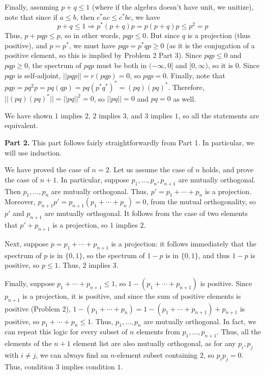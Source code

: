 \documentclass[aps,pra,showpacs,notitlepage,onecolumn,superscriptaddress,nofootinbib]{revtex4-1}
\theoremstyle{definition}
\begin{document}
Finally, assuming $p + q \leq 1$ (where if the algebra doesn't have unit, we unitize), note that since if $a \leq b$, then $c^{*} a c \leq c^{*} b c$, we have
\begin{equation}
  p + q \leq 1 \Longrightarrow p^{*}(p + q)p = p(p + q)p \leq p^2 = p
\end{equation}
Thus, $p + pqp \leq p$, so in other words, $pqp \leq 0$. But since $q$ is a projection (thus positive), and $p = p^{*}$, we must have $pqp = p^{*} q p \geq 0$ (as it is the conjugation of a positive element, so this is implied by Problem 2 Part 3). Since $pqp \leq 0$ and $pqp \geq 0$,
the spectrum of $pqp$ must be both in $(-\infty, 0]$ and $[0, \infty)$, so it is $0$. Since $pqp$ is self-adjoint,
    $||pqp|| = r(pqp) = 0$, so $pqp = 0$. Finally, note that $pqp = pq^2p = pq(qp) = pq(p^{*}q^{*})^{*} = (pq)(pq)^{*}$. Therefore, $||(pq) (pq)^{*}|| = ||pq||^2 = 0$, so $||pq|| = 0$ and $pq = 0$ as well.

    We have shown $1$ implies $2$, $2$ implies $3$, and $3$ implies $1$, so all the statements are equivalent.
\newline

\noindent \textbf{Part 2.} This part follows fairly straightforwardly from Part 1. In particular, we will use induction.

We have proved the case of $n = 2$. Let us assume the case of $n$ holds, and
prove the case of $n + 1$. In particular, suppose $p_1, \dots, p_n, p_{n + 1}$ are mutually orthogonal. Then $p_1, \dots, p_n$ are mutually orthogonal. Thus, $p' = p_1 + \cdots + p_n$ is a projection.
Moreover, $p_{n + 1} p' = p_{n + 1} (p_1 + \cdots + p_n) = 0$, from the mutual orthogonality, so $p'$ and $p_{n + 1}$ are mutually orthogonal. It follows from the case of two elements that $p' + p_{n + 1}$ is a projection, so $1$ implies $2$.

Next, suppose $p = p_1 + \cdots + p_{n + 1}$ is a projection: it follows immediately that the spectrum of $p$ is in $\{0, 1\}$, so the spectrum of $1 - p$ is in $\{0, 1\}$, and thus $1 - p$ is positive, so $p \leq 1$. Thus, $2$ implies $3$.

Finally, suppose $p_1 + \cdots + p_{n + 1} \leq 1$, so $1 - (p_1 + \cdots + p_{n + 1})$ is positive. Since $p_{n + 1}$ is a projection, it is positive, and since the sum of positive elements is positive (Problem 2), $1 - (p_1 + \cdots + p_n) = 1 - (p_1 + \cdots + p_{n + 1}) + p_{n + 1}$ is
positive, so $p_1 + \cdots + p_n \leq 1$. Thus, $p_1, \dots, p_n$ are mutually orthogonal. In fact, we can repeat this logic for every subset of $n$ elements from $p_1, \dots, p_{n + 1}$. Thus, all the elements of the $n + 1$ element list are also mutually orthogonal, as for any $p_i, p_j$ with $i \neq j$,
we can always find an $n$-element subset containing $2$, so $p_i p_j = 0$. Thus, condition $3$ implies condition $1$.
\end{document}
